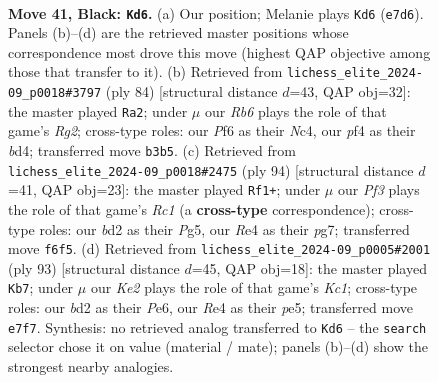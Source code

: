 \documentclass[11pt]{article}
\begin{document}
\clearpage

\begin{figure}[p]\centering
\begin{subfigure}{0.46\textwidth}\centering
\resizebox{\linewidth}{!}{%
\newchessgame
\chessboard[
  setfen={4n2R/p1p1k3/2P2p2/8/4rP1p/1r6/3B3P/3K1BR1 b - - 1 41},
  showmover=false,
  pgfstyle=straightmove, color=movearrow, markmove={e7-d6}
]}
\caption{}
\end{subfigure}\hfill
\begin{subfigure}{0.46\textwidth}\centering
\resizebox{\linewidth}{!}{%
\newchessgame
\chessboard[
  setfen={3r3k/8/3P4/4p3/2NbPp1p/5r2/6RP/3R3K w - - 1 43},
  showmover=false,
  pgfstyle=straightmove, color=movearrow, markmove={g2-a2}
]}
\caption{}
\end{subfigure}
\\[4pt]
\begin{subfigure}{0.46\textwidth}\centering
\resizebox{\linewidth}{!}{%
\newchessgame
\chessboard[
  setfen={8/2pb1kp1/2pr4/R5P1/4P3/1P1NK3/P6r/2R5 w - - 7 48},
  showmover=false,
  pgfstyle=straightmove, color=movearrow, markmove={c1-f1}
]}
\caption{}
\end{subfigure}\hfill
\begin{subfigure}{0.46\textwidth}\centering
\resizebox{\linewidth}{!}{%
\newchessgame
\chessboard[
  setfen={2k5/2p5/4p3/1P1nP1P1/r7/2p2P2/5K2/2BR4 b - - 0 47},
  showmover=false,
  pgfstyle=straightmove, color=movearrow, markmove={c8-b7}
]}
\caption{}
\end{subfigure}
\caption{\textbf{Move 41, Black: \texttt{Kd6}.} (a) Our position; Melanie plays \texttt{Kd6} (\texttt{e7d6}). Panels (b)--(d) are the retrieved master positions whose correspondence most drove this move (highest QAP objective among those that transfer to it). (b) Retrieved from \texttt{lichess\_elite\_2024-09\_p0018\#3797} (ply 84) [structural distance $d$=43, QAP obj=32]: the master played \texttt{Ra2}; under $\mu$ our \emph{Rb6} plays the role of that game's \emph{Rg2}; cross-type roles: our \emph{P}f6 as their \emph{N}c4, our \emph{p}f4 as their \emph{b}d4; transferred move \texttt{b3b5}. (c) Retrieved from \texttt{lichess\_elite\_2024-09\_p0018\#2475} (ply 94) [structural distance $d$=41, QAP obj=23]: the master played \texttt{Rf1+}; under $\mu$ our \emph{Pf3} plays the role of that game's \emph{Rc1} (a \textbf{cross-type} correspondence); cross-type roles: our \emph{b}d2 as their \emph{P}g5, our \emph{R}e4 as their \emph{p}g7; transferred move \texttt{f6f5}. (d) Retrieved from \texttt{lichess\_elite\_2024-09\_p0005\#2001} (ply 93) [structural distance $d$=45, QAP obj=18]: the master played \texttt{Kb7}; under $\mu$ our \emph{Ke2} plays the role of that game's \emph{Kc1}; cross-type roles: our \emph{b}d2 as their \emph{P}e6, our \emph{R}e4 as their \emph{p}e5; transferred move \texttt{e7f7}. Synthesis: no retrieved analog transferred to \texttt{Kd6} -- the \texttt{search} selector chose it on value (material / mate); panels (b)--(d) show the strongest nearby analogies.}
\label{fig:thought-m81}
\end{figure}
\end{document}
